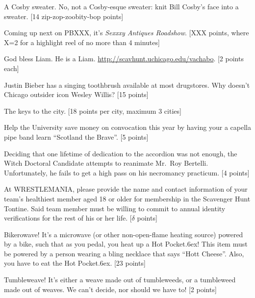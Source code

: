 \documentclass{book}
\def\tr{\raise.6ex\hbox{\scriptsize \textregistered}}
\begin{document}
\begin{list}{}{}
\item A Cosby sweater. No, not a Cosby-esque sweater: knit Bill Cosby's face into a sweater. [14 zip-zop-zoobity-bop points]

\item Coming up next on PBXXX, it's \emph{Sexxxy Antiques Roadshow}. [XXX points, where X=2 for a highlight reel of no more than 4 minutes] 

\item God bless Liam. He is a Liam. \url{http://scavhunt.uchicago.edu/vachabo}. [2 points each]

\item Justin Bieber has a singing toothbrush available at most drugstores. Why doesn't Chicago outsider icon Wesley Willis? [15 points]

\item The keys to the city. [18 points per city, maximum 3 cities] 

\item Help the University save money on convocation this year by having your a capella pipe band learn ``Scotland the Brave''. [5 points]

\item Deciding that one lifetime of dedication to the accordion was not enough, the Witch Doctoral Candidate attempts to reanimate Mr.\ Roy Bertelli. Unfortunately, he fails to get a high pass on his necromancy practicum. [4 points] 


\item At WRESTLEMANIA, please provide the name and contact information of your team's healthiest member aged 18 or older for membership in the Scavenger Hunt Tontine. Said team member must be willing to commit to annual identity verifications for the rest of his or her life. [$\delta$ points]

 
\item Bikerowave! It's a microwave (or other non-open-flame heating source) powered by a bike, such that as you pedal, you heat up a Hot Pocket\tr! This item must be powered by a person wearing a bling necklace that says ``Hott Cheese''. Also, you have to eat the Hot Pocket\tr. [23 points]

\item Tumbleweave! It's either a weave made out of tumbleweeds, or a tumbleweed made out of weaves. We can't decide, nor should we have to! [2 points]

\newpage





\end{list}
\end{document}

